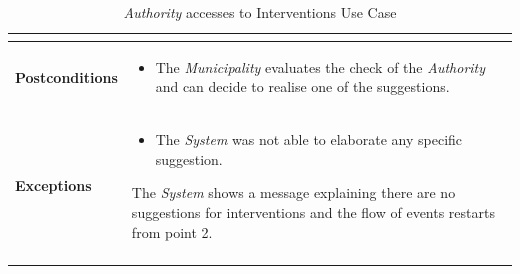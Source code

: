 \documentclass {article}
\begin{document}
\begin{longtable}{| p{3 cm} | p{10.5cm} |}
\begin{enumerate}

					\end{enumerate}	\\
			\hline
			{\bf Postconditions} & 
				\begin{itemize}
					\item The {\it Municipality} evaluates the check of the {\it Authority} and can decide to realise one of the suggestions.
				\end{itemize} \\
			\hline
			{\bf Exceptions} & 	
			\begin{itemize}
				\item The {\it System} was not able to elaborate any specific suggestion.
			\end{itemize}
			The {\it System} shows a message explaining there are no suggestions for interventions and the flow of events restarts from point 2. \\ 
			\hline
			\caption{{\it Authority} accesses to Interventions Use Case}
			\end{longtable} 

	\pagebreak
\end{document}
